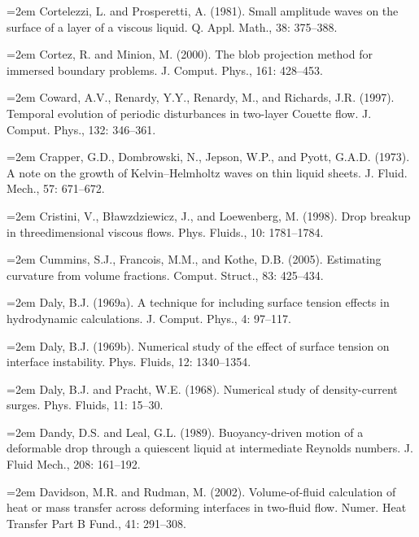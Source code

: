 \documentclass[11pt,a4paper,openany,fontset=none]{ctexbook}
\begin{document}
\par\hangindent=2em Cortelezzi, L. and Prosperetti, A. (1981). Small amplitude waves on the surface of a layer of a viscous liquid. Q. Appl. Math., 38: 375--388.

\par\hangindent=2em Cortez, R. and Minion, M. (2000). The blob projection method for immersed boundary problems. J. Comput. Phys., 161: 428--453.

\par\hangindent=2em Coward, A.V., Renardy, Y.Y., Renardy, M., and Richards, J.R. (1997). Temporal evolution of periodic disturbances in two-layer Couette flow. J. Comput. Phys., 132: 346--361.


\par\hangindent=2em Crapper, G.D., Dombrowski, N., Jepson, W.P., and Pyott, G.A.D. (1973). A note on the growth of Kelvin--Helmholtz waves on thin liquid sheets. J. Fluid. Mech., 57: 671--672.

\par\hangindent=2em Cristini, V., Bławzdziewicz, J., and Loewenberg, M. (1998). Drop breakup in threedimensional viscous flows. Phys. Fluids., 10: 1781--1784.

\par\hangindent=2em Cummins, S.J., Francois, M.M., and Kothe, D.B. (2005). Estimating curvature from volume fractions. Comput. Struct., 83: 425--434.

\par\hangindent=2em Daly, B.J. (1969a). A technique for including surface tension effects in hydrodynamic calculations. J. Comput. Phys., 4: 97--117.

\par\hangindent=2em Daly, B.J. (1969b). Numerical study of the effect of surface tension on interface instability. Phys. Fluids, 12: 1340--1354.

\par\hangindent=2em Daly, B.J. and Pracht, W.E. (1968). Numerical study of density-current surges. Phys. Fluids, 11: 15--30.

\par\hangindent=2em Dandy, D.S. and Leal, G.L. (1989). Buoyancy-driven motion of a deformable drop through a quiescent liquid at intermediate Reynolds numbers. J. Fluid Mech., 208: 161--192.

\par\hangindent=2em Davidson, M.R. and Rudman, M. (2002). Volume-of-fluid calculation of heat or mass transfer across deforming interfaces in two-fluid flow. Numer. Heat Transfer Part B Fund., 41: 291--308.
\end{document}
